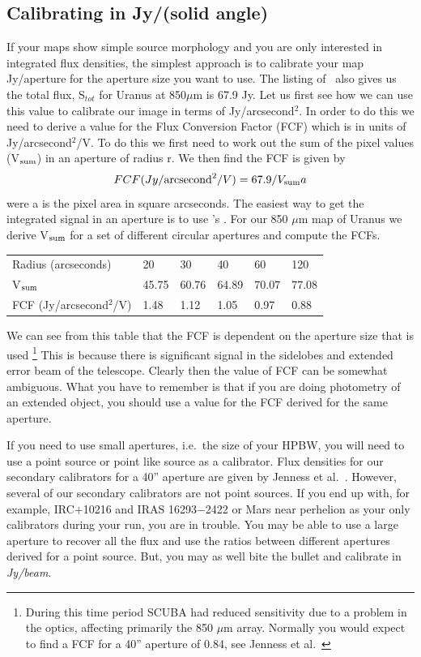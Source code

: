 \documentclass[twoside,11pt,noabs]{starlink}
\providecommand{\Kappa}{\xref{\textsc{Kappa}}{sun95}{}}
\providecommand{\fluxes}{\xref{\textsc{Fluxes}}{sun213}{}}
\providecommand{\task}[1]{\textsf{#1}}
\providecommand{\aperadd}{\xref{\task{aperadd}}{sun95}{APERADD}}
\begin{document}
\subsection{ Calibrating in Jy/(solid
angle)\label{Calibration_aperture}}

If your maps show simple source morphology and you are only interested
in integrated flux densities, the simplest approach is to calibrate
your map Jy/aperture for the aperture size you want to use.  The
listing of \fluxes\ also gives us the total flux, S$_{tot}$ for Uranus
at 850$\mu$m is 67.9 Jy.  Let us first see how we can use this value
to calibrate our image in terms of Jy/arcsecond$^2$.  In order to do
this we need to derive a value for the Flux Conversion Factor (FCF)
which is in units of Jy/arcsecond$^2$/V. To do this we first need to
work out the sum of the pixel values (V$_{\rm sum}$) in an aperture of
radius r.  We then find the FCF is given by \begin{equation}
FCF(Jy/{\rm arcsecond}^2/V)=67.9/V_{\rm sum}a \end{equation} were a is
the pixel area in square arcseconds.  The easiest way to get the
integrated signal in an aperture is to use \Kappa's \aperadd.  For our
850 $\mu$m map of Uranus we derive V$_{\rm sum}$ for a set of
different circular apertures and compute the FCFs.


\begin{tabular}[c]{llllll}
Radius (arcseconds) & 20 & 30 & 40 & 60 & 120 \\
V$_{\rm sum}$ & 45.75 & 60.76 & 64.89 & 70.07 & 77.08 \\
FCF (Jy/arcsecond$^2$/V) & 1.48 & 1.12 & 1.05 & 0.97 & 0.88 \\
\end{tabular}

We can see from this table that the FCF is dependent on the aperture
size that is used \footnote{During this time period SCUBA had reduced
sensitivity due to a problem in the optics, affecting primarily the
850 $\mu$m array.  Normally you would expect to find a FCF for a 40''
aperture of 0.84, see Jenness et al.\  \cite{Jenness01}} This is
because there is significant signal in the sidelobes and extended
error beam of the telescope.  Clearly then the value of FCF can be
somewhat ambiguous.  What you have to remember is that if you are
doing photometry of an extended object, you should use a value for the
FCF derived for the same aperture.

If you need to use small apertures, i.e.\ the size of your HPBW, you will need
to use a point source or point like source as a calibrator.  Flux densities
for our secondary calibrators for a 40'' aperture are given by Jenness et al.\
\cite{Jenness01}.  However, several of our secondary calibrators are not point
sources.  If you end up with, for example, IRC$+$10216 and IRAS 16293$-$2422
or Mars near perhelion as your only calibrators during your run, you are in
trouble.  You may be able to use a large aperture to recover all the flux and
use the ratios between different apertures derived for a point source.  But,
you may as well bite the bullet and calibrate in \textit{Jy/beam}.
\end{document}
